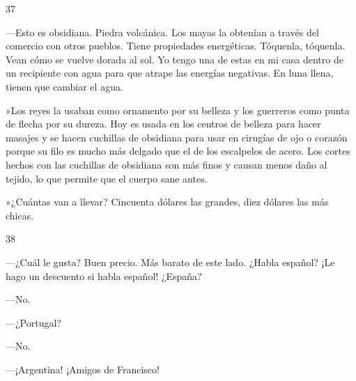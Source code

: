 \documentclass[12pt,twoside,openright,a5paper]{book}
\begin{document}
\vspace{0.5cm}

\hrulefill \hspace{0.1cm}\decofourleft\hspace{0.2cm} 37 \hspace{0.2cm}\decofourright \hspace{0.1cm}\hrulefill

\nopagebreak

\vspace{0.5cm}

\nopagebreak

---Esto es obsidiana. Piedra volcánica. Los mayas la obtenían a través
del comercio con otros pueblos. Tiene propiedades energéticas. Tóquenla,
tóquenla. Vean cómo se vuelve dorada al sol. Yo tengo una de estas en
mi casa dentro de un recipiente con agua para que atrape las energías
negativas. En luna llena, tienen que cambiar el agua.

»Los reyes la usaban como ornamento por su belleza y los guerreros como punta
de flecha por su dureza. Hoy es usada en los centros de belleza para hacer
masajes y se hacen cuchillas de obsidiana para usar en cirugías de ojo o
corazón porque su filo es mucho más delgado que el de los escalpelos de
acero. Los cortes hechos con las cuchillas de obsidiana son más finos y
causan menos daño al tejido, lo que permite que el cuerpo sane antes.

»¿Cuántas van a llevar? Cincuenta dólares las grandes, diez dólares las más chicas.

\vspace{0.5cm}

\hrulefill \hspace{0.1cm}\decofourleft\hspace{0.2cm} 38 \hspace{0.2cm}\decofourright \hspace{0.1cm}\hrulefill

\nopagebreak

\vspace{0.5cm}

\nopagebreak

---¿Cuál le gusta? Buen precio. Más barato de este lado. ¿Habla español? ¡Le
hago un descuento si habla español! ¿España?

---No.

---¿Portugal?

---No.

---¡Argentina! ¡Amigos de Francisco!
\end{document}

